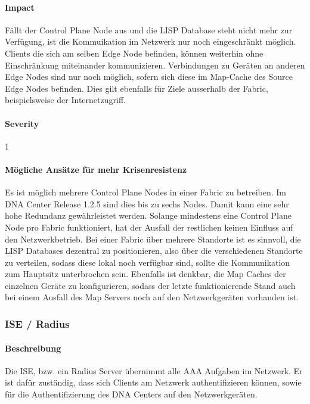 \paragraph{Impact}

Fällt der Control Plane Node aus und die LISP Database steht nicht mehr zur Verfügung, ist die Kommuikation im Netzwerk nur noch eingeschränkt möglich. Clients die sich am selben Edge Node befinden, können weiterhin ohne Einschränkung miteinander kommunizieren. Verbindungen zu Geräten an anderen Edge Nodes sind nur noch möglich, sofern sich diese im Map-Cache des Source Edge Nodes befinden. Dies gilt ebenfalls für Ziele ausserhalb der Fabric, beispielsweise der Internetzugriff.

\paragraph{Severity} 1

\paragraph{Mögliche Ansätze für mehr Krisenresistenz}

Es ist möglich mehrere Control Plane Nodes in einer Fabric zu betreiben. Im DNA Center Release 1.2.5 sind dies bis zu sechs Nodes. Damit kann eine sehr hohe Redundanz gewährleistet werden. Solange mindestens eine Control Plane Node pro Fabric funktioniert, hat der Ausfall der restlichen keinen Einfluss auf den Netzwerkbetrieb. Bei einer Fabric über mehrere Standorte ist es sinnvoll, die LISP Databases dezentral zu positionieren, also über die verschiedenen Standorte zu verteilen, sodass diese lokal noch verfügbar sind, sollte die Kommunikation zum Hauptsitz unterbrochen sein. Ebenfalls ist denkbar, die Map Caches der einzelnen Geräte zu konfigurieren, sodass der letzte funktionierende Stand auch bei einem Ausfall des Map Servers noch auf den Netzwerkgeräten vorhanden ist. 

\subsubsection{ISE / Radius}

\paragraph{Beschreibung}

Die ISE, bzw. ein Radius Server übernimmt alle AAA Aufgaben im Netzwerk. Er ist dafür zuständig, dass sich Clients am Netzwerk authentifizieren können, sowie für die Authentifizierung des DNA Centers auf den Netzwerkgeräten.

